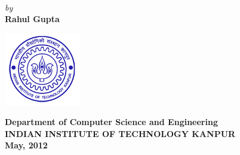 \titlepage
\begin{center}
\\
\end{center}
\vspace{50mm}
\begin{center}
{\it by}\\
\vspace{5mm}
{\bf{\Large Rahul Gupta}}\\
\end{center}
\vspace{45mm}
\begin{center}
\includegraphics[width=0.25\textwidth]{diagrams/iitklogo.png}
\end{center}
\begin{center}
\vspace{3mm}
{\bf {\large {\sc Department of Computer Science and Engineering}}}\\
\vspace{2mm}
{\bf {\large INDIAN INSTITUTE OF TECHNOLOGY KANPUR}}\\
\vspace{3mm}
{\textbf{ May, 2012}}\\
\end{center}


